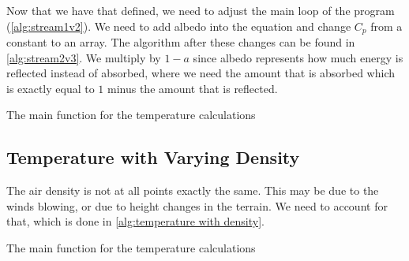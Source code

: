 Now that we have that defined, we need to adjust the main loop of the program (\autoref{alg:stream1v2}). We need to add albedo into the
equation and change $C_p$ from a constant to an array. The algorithm after these changes can be found in \autoref{alg:stream2v3}. We multiply by $1 - a$ since albedo represents how much energy is 
reflected instead of absorbed, where we need the amount that is absorbed which is exactly equal to $1$ minus the amount that is reflected.

\begin{algorithm}[hbt]
    \SetAlgoLined
    \caption{The main function for the temperature calculations}
    \label{alg:stream2v3}
\end{algorithm}

\subsection{Temperature with Varying Density}
The air density is not at all points exactly the same. This may be due to the winds blowing, or due to height changes in the terrain. We need to account for that, which is done in 
\autoref{alg:temperature with density}.

\begin{algorithm}[hbt]
    \SetAlgoLined
    \caption{The main function for the temperature calculations}
    \label{alg:temperature with density}
\end{algorithm}

